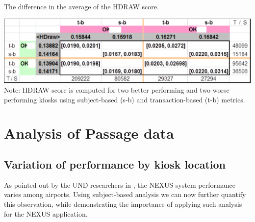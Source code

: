\documentclass{cta-author}%
\begin{document}
\begin{table}[!b] 
\caption{The difference in the average of the HDRAW score. 
\label{t.kiosks-t-test}}
\scriptsize {
\includegraphics[width=\linewidth]{eps/T-test-kiosks-hidden.eps} 
Note: HDRAW score is computed for two better performing and two worse performing kiosks using  subject-based (s-b) and transaction-based (t-b) metrics. 
}{}
\end{table}






\section{Analysis of Passage data}
\label{s.resultsPA}

\subsection{Variation of performance by kiosk location}


As pointed out by the  UND researchers in \cite{Bowyer2015-cvpr,Bowyer-BTAS2016}, the NEXUS system performance  varies  among  airports.
Using subject-based analysis 
we can now
further quantify this observation, while demonstrating the importance of applying such analysis for the NEXUS application.
\end{document}
